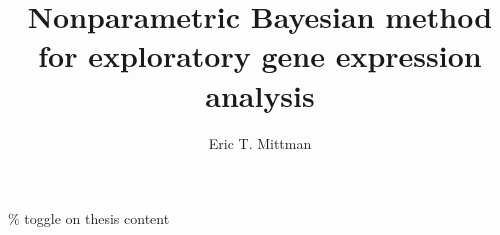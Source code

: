 \documentclass{article}
\title{Nonparametric Bayesian method for exploratory gene expression analysis}
\author{Eric T. Mittman}
\begin{document}
\% toggle on thesis content
\newtoggle{thesis}
\togglefalse{thesis}
\maketitle


\clearpage

\appendix



\end{document}
